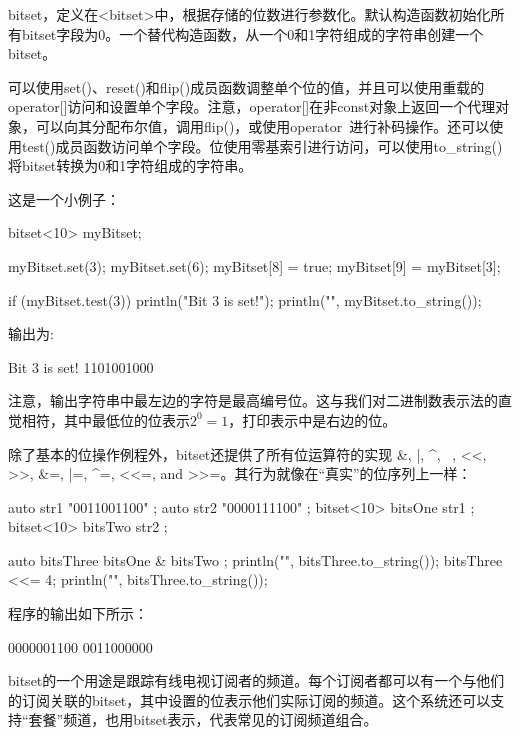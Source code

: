 
bitset，定义在<bitset>中，根据存储的位数进行参数化。默认构造函数初始化所有bitset字段为0。一个替代构造函数，从一个0和1字符组成的字符串创建一个bitset。

可以使用set()、reset()和flip()成员函数调整单个位的值，并且可以使用重载的operator[]访问和设置单个字段。注意，operator[]在非const对象上返回一个代理对象，可以向其分配布尔值，调用flip()，或使用operator~进行补码操作。还可以使用test()成员函数访问单个字段。位使用零基索引进行访问，可以使用to\_string()将bitset转换为0和1字符组成的字符串。

这是一个小例子：

\begin{cpp}
bitset<10> myBitset;

myBitset.set(3);
myBitset.set(6);
myBitset[8] = true;
myBitset[9] = myBitset[3];

if (myBitset.test(3)) { println("Bit 3 is set!"); }
println("{}", myBitset.to_string());
\end{cpp}

输出为:

\begin{shell}
Bit 3 is set!
1101001000
\end{shell}

注意，输出字符串中最左边的字符是最高编号位。这与我们对二进制数表示法的直觉相符，其中最低位的位表示$2^0 = 1$，打印表示中是右边的位。


除了基本的位操作例程外，bitset还提供了所有位运算符的实现 \&, |, \^{}, ~, <{}<, >{}>, \&=, |=, \^{}=, <{}<=, and >{}>=。其行为就像在“真实”的位序列上一样：

\begin{cpp}
auto str1 { "0011001100" };
auto str2 { "0000111100" };
bitset<10> bitsOne { str1 };
bitset<10> bitsTwo { str2 };

auto bitsThree { bitsOne & bitsTwo };
println("{}", bitsThree.to_string());
bitsThree <<= 4;
println("{}", bitsThree.to_string());
\end{cpp}

程序的输出如下所示：

\begin{shell}
0000001100
0011000000
\end{shell}


bitset的一个用途是跟踪有线电视订阅者的频道。每个订阅者都可以有一个与他们的订阅关联的bitset，其中设置的位表示他们实际订阅的频道。这个系统还可以支持“套餐”频道，也用bitset表示，代表常见的订阅频道组合。

